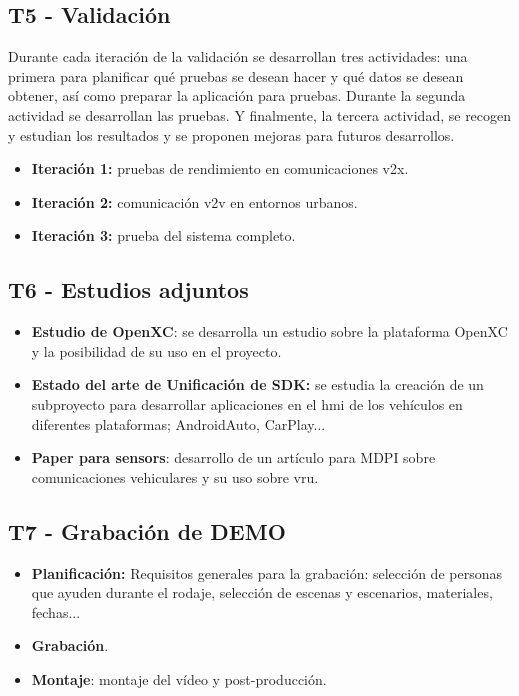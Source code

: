 \subsection{T5 - Validación}
Durante cada iteración de la validación se desarrollan tres actividades: una
primera para planificar qué pruebas se desean hacer y qué datos se desean obtener,
así como preparar la aplicación para pruebas. Durante la segunda actividad se
desarrollan las pruebas. Y finalmente, la tercera actividad, se recogen y estudian
los resultados y se proponen mejoras para futuros desarrollos.
\begin{itemize}
	\item \textbf{Iteración 1:} pruebas de rendimiento en comunicaciones \gls{v2x}.

	\item \textbf{Iteración 2:} comunicación \gls{v2v} en entornos urbanos.

	\item \textbf{Iteración 3:} prueba del sistema completo.
\end{itemize}

\subsection{T6 - Estudios adjuntos}
\begin{itemize}
	\item \textbf{Estudio de OpenXC}: se desarrolla un estudio sobre la plataforma
	OpenXC y la posibilidad de su uso en el proyecto.

	\item \textbf{Estado del arte de Unificación de SDK:} se estudia la creación de
	un subproyecto para	desarrollar aplicaciones en el \gls{hmi} de los vehículos en
	diferentes plataformas; AndroidAuto, CarPlay...

	\item \textbf{Paper para sensors}: desarrollo de un artículo para MDPI sobre
	comunicaciones vehiculares y su uso sobre \gls{vru}.
\end{itemize}

\subsection{T7 - Grabación de DEMO}
\begin{itemize}
	\item \textbf{Planificación:} Requisitos generales para la grabación: selección
	de personas que ayuden durante el rodaje, selección de escenas y escenarios,
	materiales, fechas...

	\item \textbf{Grabación}.

	\item \textbf{Montaje}: montaje del vídeo y post-producción.
\end{itemize}
